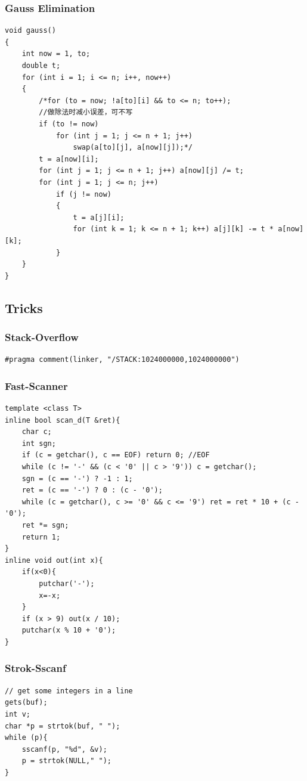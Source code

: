 \documentclass[twoside]{article}
\begin{document}
\subsubsection{Gauss Elimination}
\begin{lstlisting}
void gauss()
{
    int now = 1, to;
    double t;
    for (int i = 1; i <= n; i++, now++)
    {
        /*for (to = now; !a[to][i] && to <= n; to++);
        //做除法时减小误差，可不写
        if (to != now)
            for (int j = 1; j <= n + 1; j++)
                swap(a[to][j], a[now][j]);*/
        t = a[now][i];
        for (int j = 1; j <= n + 1; j++) a[now][j] /= t;
        for (int j = 1; j <= n; j++)
            if (j != now)
            {
                t = a[j][i];
                for (int k = 1; k <= n + 1; k++) a[j][k] -= t * a[now][k];
            }
    }
}
\end{lstlisting}
\subsection{Tricks}
\subsubsection{Stack-Overflow}
\begin{lstlisting}
#pragma comment(linker, "/STACK:1024000000,1024000000")
\end{lstlisting}
\subsubsection{Fast-Scanner}
\begin{lstlisting}
template <class T>
inline bool scan_d(T &ret){
    char c;
    int sgn;
    if (c = getchar(), c == EOF) return 0; //EOF
    while (c != '-' && (c < '0' || c > '9')) c = getchar();
    sgn = (c == '-') ? -1 : 1;
    ret = (c == '-') ? 0 : (c - '0');
    while (c = getchar(), c >= '0' && c <= '9') ret = ret * 10 + (c - '0');
    ret *= sgn;
    return 1;
}
inline void out(int x){
    if(x<0){
        putchar('-');
        x=-x;
    }
    if (x > 9) out(x / 10);
    putchar(x % 10 + '0');
}
\end{lstlisting}
\subsubsection{Strok-Sscanf}
\begin{lstlisting}
// get some integers in a line
gets(buf);
int v;
char *p = strtok(buf, " ");
while (p){
    sscanf(p, "%d", &v);
    p = strtok(NULL," ");
}
\end{lstlisting}
\end{document}
